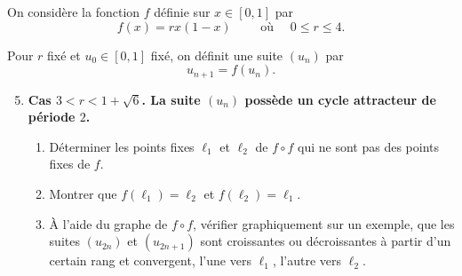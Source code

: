 





\begin{frame}[fragile]
\begin{tp}
On considère la fonction $f$ définie sur $x \in [0,1]$ par 
$$f(x)=rx(1-x) \qquad \text{ où } \quad 0 \le  r \le 4.$$

Pour $r$ fixé et $u_0 \in [0,1]$ fixé, on définit une suite $(u_n)$ par
$$u_{n+1} = f(u_n).$$

\begin{enumerate}
\setcounter{enumi}{4} 
\item
\textbf{Cas $3<r<1+\sqrt{6}$. La suite $(u_n)$ possède un cycle attracteur de période $2$.}
\pause 
  \begin{enumerate}
    \item Déterminer les points fixes $\ell_1$ et $\ell_2$ de $f\circ f$ qui ne sont pas des points fixes 
    de $f$.
 \pause     
    \item Montrer que $f(\ell_1) = \ell_2$ et $f(\ell_2)=\ell_1$.
  \pause      
    \item \`A l'aide du graphe de $f\circ f$, vérifier graphiquement sur un exemple, 
    que les suites $(u_{2n})$ et $(u_{2n+1})$ sont croissantes ou décroissantes à partir d'un certain rang
    et convergent, l'une vers $\ell_1$, l'autre vers $\ell_2$.
  \end{enumerate} 

  \end{enumerate}
\end{tp}
\end{frame}



